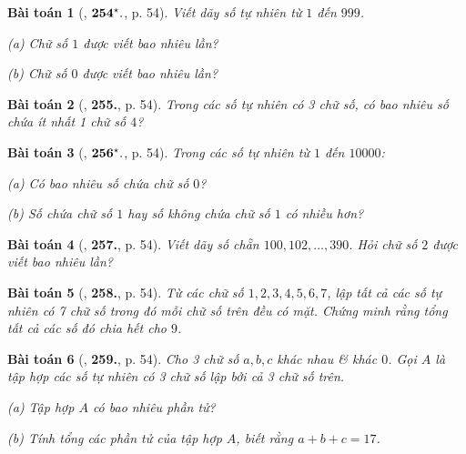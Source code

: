 \documentclass{article}
\numberwithin{equation}{section}
\newtheorem{baitoan}{Bài toán}
\begin{document}
\begin{baitoan}[\cite{Binh_Toan_6_tap_1}, $\bf 254^\star.$, p. 54]
	Viết dãy số tự nhiên từ $1$ đến $999$.
	\begin{enumerate*}
		\item[(a)] Chữ số $1$ được viết bao nhiêu lần?
		\item[(b)] Chữ số $0$ được viết bao nhiêu lần?
	\end{enumerate*}
\end{baitoan}

\begin{baitoan}[\cite{Binh_Toan_6_tap_1}, \textbf{255.}, p. 54]
	Trong các số tự nhiên có 3 chữ số, có bao nhiêu số chứa ít nhất 1 chữ số $4$?
\end{baitoan}

\begin{baitoan}[\cite{Binh_Toan_6_tap_1}, $\bf 256^\star.$, p. 54]
	Trong các số tự nhiên từ $1$ đến $10000$:
	\begin{enumerate*}
		\item[(a)] Có bao nhiêu số chứa chữ số $0$?
		\item[(b)] Số chứa chữ số $1$ hay số không chứa chữ số $1$ có nhiều hơn?
	\end{enumerate*}
\end{baitoan}

\begin{baitoan}[\cite{Binh_Toan_6_tap_1}, \textbf{257.}, p. 54]
	Viết dãy số chẵn $100,102,\ldots,390$. Hỏi chữ số $2$ được viết bao nhiêu lần?
\end{baitoan}

\begin{baitoan}[\cite{Binh_Toan_6_tap_1}, \textbf{258.}, p. 54]
	Từ các chữ số $1,2,3,4,5,6,7$, lập tất cả các số tự nhiên có 7 chữ số trong đó mỗi chữ số trên đều có mặt. Chứng minh rằng tổng tất cả các số đó chia hết cho $9$.
\end{baitoan}

\begin{baitoan}[\cite{Binh_Toan_6_tap_1}, \textbf{259.}, p. 54]
	Cho 3 chữ số $a,b,c$ khác nhau \& khác $0$. Gọi $A$ là tập hợp các số tự nhiên có 3 chữ số lập bởi cả 3 chữ số trên.
	\begin{enumerate*}
		\item[(a)] Tập hợp $A$ có bao nhiêu phần tử?
		\item[(b)] Tính tổng các phần tử của tập hợp $A$, biết rằng $a + b + c = 17$.
	\end{enumerate*}
\end{baitoan}
\end{document}
